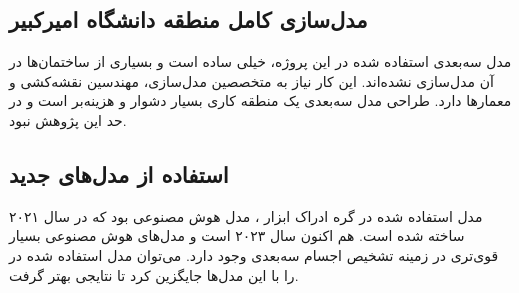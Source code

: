 \subsection{مدل‌سازی کامل منطقه دانشگاه امیرکبیر}
مدل سه‌بعدی استفاده شده در این پروژه، خیلی ساده است و بسیاری از ساختمان‌ها در آن مدل‌سازی نشده‌اند. این کار نیاز به متخصصین مدل‌سازی، مهندسین نقشه‌کشی و معمارها دارد. طراحی مدل سه‌بعدی یک منطقه کاری بسیار دشوار و هزینه‌بر است و در حد این پژوهش نبود.

\subsection{استفاده از مدل‌های جدید}
مدل استفاده شده در گره ادراک ابزار ، مدل هوش مصنوعی  بود که در سال ۲۰۲۱ ساخته شده است. هم اکنون سال ۲۰۲۳ است و مدل‌های هوش مصنوعی بسیار قوی‌تری در زمینه تشخیص اجسام سه‌بعدی وجود دارد. می‌توان مدل استفاده شده در  را با این مدل‌ها جایگزین کرد تا نتایجی بهتر گرفت.